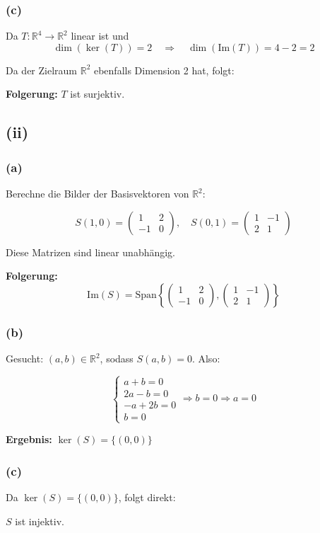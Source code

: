 \documentclass{article}
\begin{document}
\subsubsection*{(c)}
Da \( T: \mathbb{R}^4 \rightarrow \mathbb{R}^2 \) linear ist und 
\[
\dim(\ker(T)) = 2 \quad \Rightarrow \quad \dim(\text{Im}(T)) = 4 - 2 = 2
\]

Da der Zielraum \( \mathbb{R}^2 \) ebenfalls Dimension 2 hat, folgt:

\textbf{Folgerung:} \( T \) ist surjektiv.


\subsection*{(ii)}
\subsubsection*{(a)}
Berechne die Bilder der Basisvektoren von \( \mathbb{R}^2 \):

\[
S(1, 0) = 
\begin{pmatrix}
1 & 2 \\
-1 & 0
\end{pmatrix}, \quad
S(0, 1) = 
\begin{pmatrix}
1 & -1 \\
2 & 1
\end{pmatrix}
\]

Diese Matrizen sind linear unabhängig.

\textbf{Folgerung:}
\[
\text{Im}(S) = \text{Span} \left\{
\begin{pmatrix}
1 & 2 \\
-1 & 0
\end{pmatrix},
\begin{pmatrix}
1 & -1 \\
2 & 1
\end{pmatrix}
\right\}
\]

\subsubsection*{(b)}

Gesucht: \( (a, b) \in \mathbb{R}^2 \), sodass \( S(a, b) = 0 \). Also:

\[
\begin{cases}
a + b = 0 \\
2a - b = 0 \\
-a + 2b = 0 \\
b = 0
\end{cases}
\Rightarrow b = 0 \Rightarrow a = 0
\]

\textbf{Ergebnis:} \( \ker(S) = \{(0, 0)\} \)

\subsubsection*{(c)}
Da \( \ker(S) = \{(0, 0)\} \), folgt direkt:

\( S \) ist injektiv.
\end{document}
